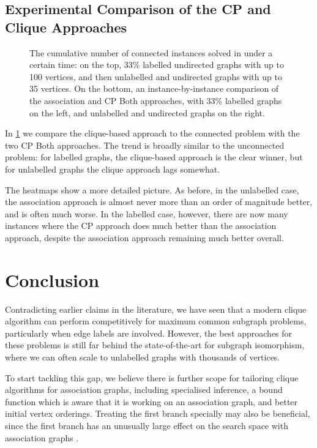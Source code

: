 \documentclass{llncs}
\begin{document}
\subsection{Experimental Comparison of the CP and Clique Approaches}\label{mccs-eval}

\begin{figure}[tb]
    \centering
    
    \vspace*{1em}

    \centering
    
    \caption{The cumulative number of connected instances solved in under a certain time: on the
        top, 33\% labelled undirected graphs with up to 100 vertices, and then unlabelled
        and undirected graphs with up to 35 vertices. On the bottom, an instance-by-instance
        comparison of the association and CP Both approaches, with 33\% labelled graphs on the
        left, and unlabelled and undirected graphs on the right.} \label{figure:connected-cumulative}
\end{figure}

In \cref{figure:connected-cumulative} we compare the clique-based approach to the connected problem
with the two CP Both approaches. The trend is broadly similar to the unconnected problem: for labelled
graphs, the clique-based approach is the clear winner, but for unlabelled graphs the clique approach
lags somewhat.

The heatmaps show a more detailed picture. As before, in the unlabelled case, the association
approach is almost never more than an order of magnitude better, and is often much worse. In the
labelled case, however, there are now many instances where the CP approach does much better than the
association approach, despite the association approach remaining much better overall.

\section{Conclusion}

Contradicting earlier claims in the literature, we have seen that a modern clique algorithm can
perform competitively for maximum common subgraph problems, particularly when edge labels are
involved. However, the best approaches for these problems is still far behind the state-of-the-art
for subgraph isomorphism, where we can often scale to unlabelled graphs with thousands of vertices.

To start tackling this gap, we believe there is further scope for tailoring clique algorithms for
association graphs, including specialised inference, a bound function which is aware that it is
working on an association graph, and better initial vertex orderings. Treating the first branch
specially may also be beneficial, since the first branch has an unusually large effect on the search
space with association graphs \cite{DBLP:conf/cocoon/SutersAZSSL05}.
\end{document}
